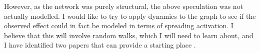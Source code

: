 \documentclass{article}
\begin{document}
However, as the network was purely structural, the above speculation was not
actually modelled. I would like to try to apply dynamics to the graph to see
if the observed effect could in fact be modeled in terms of spreading activation.
I believe that this will involve random walks, which I will need to learn about,
and I have identified two papers that can provide a starting place \citep{r08, noh2004}.



\end{document}
